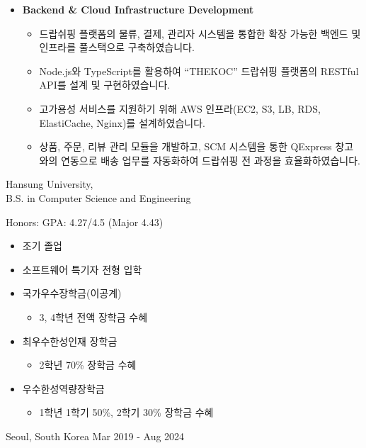 \documentclass[10pt, a4paper]{cvhari}
\begin{document}
\begin{itemize}
\begin{itemize}
    \end{itemize}
  \item \textbf{Backend \& Cloud Infrastructure Development}
    \begin{itemize}
      \item 드랍쉬핑 플랫폼의 물류, 결제, 관리자 시스템을 통합한 확장 가능한 백엔드 및 인프라를 풀스택으로 구축하였습니다.
      \item Node.js와 TypeScript를 활용하여 “THEKOC” 드랍쉬핑 플랫폼의 RESTful API를 설계 및 구현하였습니다.
      \item 고가용성 서비스를 지원하기 위해 AWS 인프라(EC2, S3, LB, RDS, ElastiCache, Nginx)를 설계하였습니다.
      \item 상품, 주문, 리뷰 관리 모듈을 개발하고, SCM 시스템을 통한 QExpress 창고와의 연동으로 배송 업무를 자동화하여 드랍쉬핑 전 과정을 효율화하였습니다.
    \end{itemize}
\end{itemize}

\smallskip
    \education
        {Hansung University,\\ B.S. in Computer Science and Engineering}
        {
            Honors: GPA: 4.27/4.5 (Major 4.43)
            \begin{itemize}
                \item 조기 졸업
                \item 소프트웨어 특기자 전형 입학
                \item 국가우수장학금(이공계)
                \begin{itemize}
                    \item 3, 4학년 전액 장학금 수혜
                \end{itemize}
                \item 최우수한성인재 장학금
                \begin{itemize}
                    \item 2학년 70\% 장학금 수혜
                \end{itemize}
                \item 우수한성역량장학금
                \begin{itemize}
                    \item 1학년 1학기 50\%, 2학기 30\% 장학금 수혜
                \end{itemize}
            \end{itemize}
        }
        {Seoul, South Korea}
        {Mar 2019 - Aug 2024}
        \par
\end{document}
